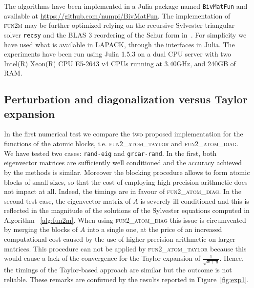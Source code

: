 \documentclass{siamart1116}
\begin{document}
The algorithms have been implemented in a Julia package named \texttt{BivMatFun} and available at \url{https://github.com/numpi/BivMatFun}. 
The implementation of \textsc{fun2m} may be further optimized relying on the recursive Sylvester triangular solver \texttt{recsy} \cite{jonsson2003recsy} 
and the BLAS 3 reordering of the Schur form in~\cite{kressner2006block}. For simplicity we have used what is available in LAPACK, through the 
interfaces in Julia. 
The experiments have been run using Julia 1.5.3 on a dual CPU server with two
Intel(R) Xeon(R) CPU E5-2643 v4 CPUs running at 3.40GHz, and 240GB of RAM.

\subsection{Perturbation and diagonalization versus Taylor expansion}
In the first numerical test we compare the two proposed implementation for the functions of the atomic blocks, i.e. \textsc{fun2\_atom\_taylor} and \textsc{fun2\_atom\_diag}. We have tested two cases: \texttt{rand-eig} and \texttt{grcar-rand}. In the first, both eigenvector matrices are sufficiently well conditioned and the accuracy achieved by the methods is similar.  Moreover the blocking procedure allows to form atomic blocks of small sizes, so that the cost of employing high precision arithmetic does not impact at all. Indeed, the timings are in favour of \textsc{fun2\_atom\_diag}. In the second test case, the eigenvector matrix of $A$ is severely ill-conditioned and this is reflected in the magnitude of the solutions of the Sylvester equations computed in Algorithm
~\ref{alg:fun2m}. When using \textsc{fun2\_atom\_diag} this issue is circumvented by merging the blocks of $A$ into a single one, at the price of an increased computational cost caused by the use of higher precision arithmetic on larger matrices. This procedure can not be applied by \textsc{fun2\_atom\_taylor} because this would cause a lack of the convergence for the Taylor expansion of $\frac{1}{\sqrt{x+y}}$. Hence, the timings of the Taylor-based approach are similar but the outcome is not reliable. These remarks are confirmed by the results reported in Figure~\ref{fig:exp1}.
\end{document}
